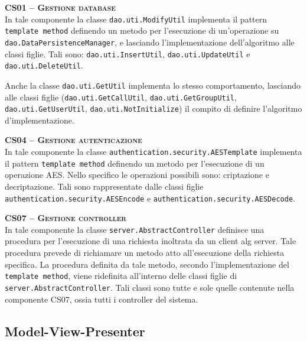 \begin{description}

  \item{\scshape\bfseries CS01 -- Gestione database}\\
In tale componente la classe \texttt{dao.uti.ModifyUtil} implementa il pattern \texttt{template method} definendo un metodo per l'esecuzione di un'operazione su \texttt{dao.DataPersistenceManager}, e lasciando l'implementazione dell'algoritmo alle classi figlie. Tali sono: \texttt{dao.uti.InsertUtil}, \texttt{dao.uti.UpdateUtil} e \texttt{dao.uti.DeleteUtil}.

Anche la classe \texttt{dao.uti.GetUtil} implementa lo stesso comportamento, lasciando alle classi figlie (\texttt{dao.uti.GetCallUtil}, \texttt{dao.uti.GetGroupUtil}, \texttt{dao.uti.GetUserUtil}, \texttt{dao.uti.NotInitialize}) il compito di definire l'algoritmo d'implementazione.

	\item{\scshape\bfseries CS04 -- Gestione autenticazione}\\
In tale componente la classe \texttt{authentication.security.AESTemplate} implementa il pattern \texttt{template method} definendo un metodo per l'esecuzione di un operazione AES. Nello specifico le operazioni possibili sono: criptazione e decriptazione. Tali sono rappresentate dalle classi figlie \texttt{authentication.security.AESEncode} e \texttt{authentication.security.AESDecode}.

	\item{\scshape\bfseries CS07 -- Gestione controller}\\
In tale componente la classe \texttt{server.AbstractController} definisce una procedura per l'esecuzione di una richiesta inoltrata da un client alg server. Tale procedura prevede di richiamare un metodo atto all'esecuzione della richiesta specifica. La procedura definita da tale metodo, secondo l'implementazione del \texttt{template method}, viene ridefinita all'interno delle classi figlie di \texttt{server.AbstractController}. Tali classi sono tutte e sole quelle contenute nella componente CS07, ossia tutti i controller del sistema.

\end{description}

\subsection{Model-View-Presenter}\label{sec:MVP}

